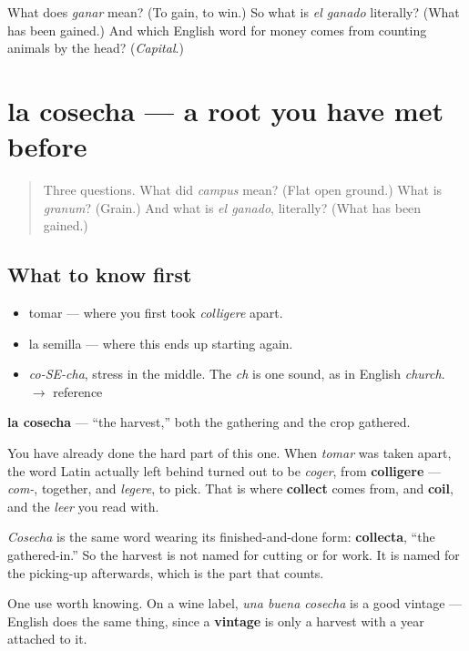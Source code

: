 \begin{tcolorbox}[breakable,colback=teal!4,colframe=teal!35!black,title={Before you move on}]
What does \emph{ganar} mean? (To gain, to win.) So what is \emph{el ganado} literally? (What has been gained.) And which English word for money comes from counting animals by the head? (\emph{Capital}.)
\end{tcolorbox}
\section[la cosecha]{la cosecha — a root you have met before}

\label{lesson:ES-C299-cosecha}



\begin{quote}
Three questions. What did \emph{campus} mean? (Flat open ground.) What is \emph{granum}? (Grain.) And what is \emph{el ganado}, literally? (What has been gained.)
\end{quote}

\subsection*{What to know first}
\begin{itemize}
\raggedright
  \item tomar — where you first took \emph{colligere} apart.
  \item la semilla — where this ends up starting again.
\end{itemize}

\begin{sounds}
\begin{itemize}
\raggedright
  \item \emph{co-SE-cha}, stress in the middle. The \emph{ch} is one sound, as in English \emph{church}. $\to$ reference
\end{itemize}
\end{sounds}

\begin{cousinweb}
\textbf{la cosecha} — \textquotedblleft{}the harvest,\textquotedblright{} both the gathering and the crop gathered.

You have already done the hard part of this one. When \emph{tomar} was taken apart, the word Latin actually left behind turned out to be \emph{coger}, from \textbf{colligere} — \emph{com-}, together, and \emph{legere}, to pick. That is where \textbf{collect} comes from, and \textbf{coil}, and the \emph{leer} you read with.

\emph{Cosecha} is the same word wearing its finished-and-done form: \textbf{collecta}, \textquotedblleft{}the gathered-in.\textquotedblright{} So the harvest is not named for cutting or for work. It is named for the picking-up afterwards, which is the part that counts.

One use worth knowing. On a wine label, \emph{una buena cosecha} is a good vintage — English does the same thing, since a \textbf{vintage} is only a harvest with a year attached to it.
\end{cousinweb}

